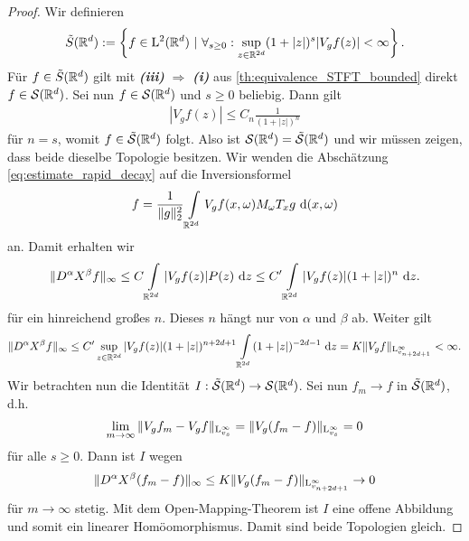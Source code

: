\begin{proof}
	Wir definieren
	\begin{align*}
	\tilde{S}(\mathbb{R}^d)
	:= \left\{
	f \in \mathrm{L}^2(\mathbb{R}^d) \ | \ \forall_{ s \geq 0} : \sup \limits_{z \in \mathbb{R}^{2d}} (1+ |z|)^s| V_g f(z)|< \infty
	\right\}.
	\end{align*}
	Für $ f \in \tilde{S}(\mathbb{R}^d) $ gilt mit \textbf{\textit{\itshape\textrm{(iii)}}} $ \Rightarrow $ \textbf{\textit{\textrm{(i)}}} aus \ref{th:equivalence_STFT_bounded} direkt $ f \in \mathcal{S}(\mathbb{R}^d) $.
	Sei nun $ f \in \mathcal{S}(\mathbb{R}^d) $ und $ s \geq 0  $ beliebig. Dann gilt
	\begin{align*}
	|V_g f(z) | \leq C_n \frac{1}{(1+ |z|)^n} 
	\end{align*}
	für $ n = s$, womit $ f \in \tilde{\mathcal{S}}(\mathbb{R}^d) $ folgt.
	Also ist $ \mathcal{S}(\mathbb{R}^d) = \tilde{\mathcal{S}}(\mathbb{R}^d) $ und wir müssen zeigen, dass beide dieselbe Topologie besitzen.
	Wir wenden die Abschätzung \eqref{eq:estimate_rapid_decay} auf die Inversionsformel
	\begin{align*}
	f = \frac{1}{\|g\|_2^2} \int \limits_{\mathbb{R}^{2d}}
	V_g f(x,\omega) M_\omega T_x g \text{ d} (x,\omega)
	\end{align*}
	an. Damit erhalten wir
	\begin{align*}
	\| D^\alpha X^\beta f \|_\infty
	\leq
	C \int \limits_{\mathbb{R}^{2d}} |V_g f(z)| P(z) \text{ d} z
	\leq 
	C^\prime \int \limits_{\mathbb{R}^{2d}} |V_g f(z)| (1+ |z|)^n \text{ d} z.
	\end{align*}
	für ein hinreichend großes $ n $.
	Dieses $ n $ hängt nur von $ \alpha $ und $ \beta $ ab.
	 Weiter gilt
	\begin{align}\label{eq:equivalence_seminorms_2}
	\| D^\alpha X^\beta f \|_\infty \leq
	C^\prime 
	\sup \limits_{z \in \mathbb{R}^{2d}} | V_g f(z) | (1+ |z|)^{n + 2d + 1}
	\int \limits_{\mathbb{R}^{2d}} (1+ |z|)^{-2d - 1} \text{ d} z 
	= K \| V_g f \|_{\mathrm{L}^\infty_{v_{n+2d+ 1}}} < \infty.
	\end{align}
	Wir betrachten nun die Identität $ I :\tilde{\mathcal{S}}(\mathbb{R}^d) \to \mathcal{S}(\mathbb{R}^d) $.
	Sei nun $ f_m \to f  $ in $ \tilde{\mathcal{S}}(\mathbb{R}^d) $, d.h.
	\begin{align*}
	\lim \limits_{m \to \infty} 
	\| V_g f_m - V_g f \|_{\mathrm{L}^\infty_{v_s}}
	=
	\| V_g (f_m - f) \|_{\mathrm{L}^\infty_{v_s}} =0 
	\end{align*}
	für alle $ s \geq 0 $. Dann ist $ I $ wegen
	\begin{align*}
	\| D^\alpha X^\beta (f_m - f) \|_\infty \leq
	 K \| V_g (f_m -f) \|_{\mathrm{L}^\infty_{v_{n+2d+ 1}}}
	\to 0
	\end{align*}
	 für $ m \to \infty $ stetig. Mit dem Open-Mapping-Theorem ist $ I $ eine offene Abbildung und somit ein linearer Homöomorphismus. Damit sind beide Topologien gleich.
\end{proof}


